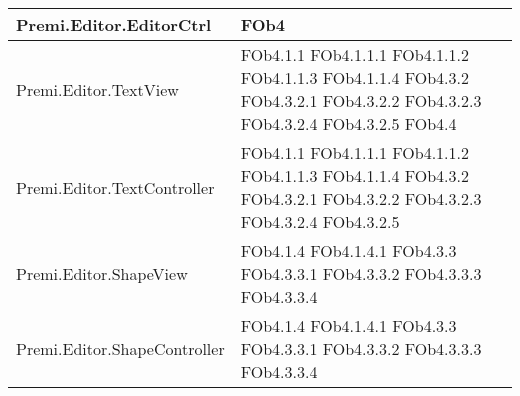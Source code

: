 \begin{longtable}{|p{10cm}|p{4cm}|}
\hline
Premi.Editor.EditorCtrl & FOb4 \linebreak \\
\hline
Premi.Editor.TextView & FOb4.1.1 \linebreak FOb4.1.1.1 \linebreak FOb4.1.1.2 \linebreak FOb4.1.1.3 \linebreak FOb4.1.1.4 \linebreak FOb4.3.2 \linebreak FOb4.3.2.1 \linebreak FOb4.3.2.2 \linebreak FOb4.3.2.3 \linebreak FOb4.3.2.4 \linebreak FOb4.3.2.5 \linebreak FOb4.4 \linebreak \\
\hline
Premi.Editor.TextController & FOb4.1.1 \linebreak FOb4.1.1.1 \linebreak FOb4.1.1.2 \linebreak FOb4.1.1.3 \linebreak FOb4.1.1.4 \linebreak FOb4.3.2 \linebreak FOb4.3.2.1 \linebreak FOb4.3.2.2 \linebreak FOb4.3.2.3 \linebreak FOb4.3.2.4 \linebreak FOb4.3.2.5 \linebreak \\
\hline
Premi.Editor.ShapeView & FOb4.1.4 \linebreak FOb4.1.4.1 \linebreak FOb4.3.3 \linebreak FOb4.3.3.1 \linebreak FOb4.3.3.2 \linebreak FOb4.3.3.3 \linebreak FOb4.3.3.4 \linebreak \\
\hline
Premi.Editor.ShapeController & FOb4.1.4 \linebreak FOb4.1.4.1 \linebreak FOb4.3.3 \linebreak FOb4.3.3.1 \linebreak FOb4.3.3.2 \linebreak FOb4.3.3.3 \linebreak FOb4.3.3.4 \linebreak \\

\end{longtable}

